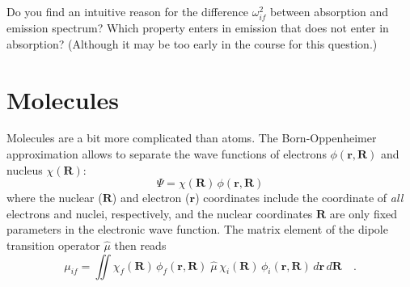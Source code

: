 \begin{questions}
  \item Do you find an intuitive reason for the difference $\omega_{if}^2$ between absorption and emission spectrum? Which property enters in emission that does not enter in absorption? (Although it may be too early in the course for this question.)
\end{questions}



\section{Molecules}


Molecules are a bit more complicated than atoms.
The Born-Oppenheimer approximation  allows to separate the wave functions of electrons $ \phi(\mathbf{r}, \mathbf{R})$ and nucleus $ \chi(\mathbf{R}) $:
\begin{equation}
 \Psi = \chi(\mathbf{R}) \, \phi(\mathbf{r}, \mathbf{R}) \label{eq:elec_wf_FC}
\end{equation}
where the nuclear ($\mathbf{R}$) and electron ($\mathbf{r}$) coordinates include the coordinate of \emph{all} electrons and nuclei, respectively, and the nuclear coordinates $\mathbf{R}$ are only fixed parameters in the electronic wave function. The matrix element of the dipole transition operator $\hat{\mu}$ then reads
\begin{equation}
 \mu_{if} = \iint \chi_f(\mathbf{R}) \, \phi_f(\mathbf{r} , \mathbf{R}) \; \hat{\mu}
 \, \chi_i(\mathbf{R}) \, \phi_i(\mathbf{r}, \mathbf{R}) \, d \mathbf{r} \, d \mathbf{R} \quad .
\end{equation}


